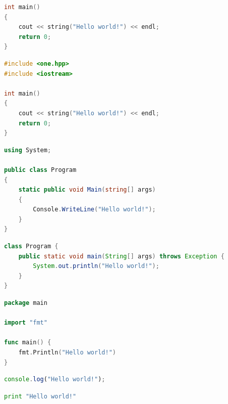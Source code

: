 \documentclass[10pt,conference,a4paper,onecolumn] {IEEEtran}
\begin{document}
\begin{multicols}{2}
\begin{lstlisting}[language=C,style=c, xleftmargin=2em, frame=single,framexleftmargin=1.5em, firstnumber=1, caption={Example C: Hello world!}, breaklines=true, label={list:compose},captionpos=b,escapechar=|]
int main()
{
    cout << string("Hello world!") << endl;
    return 0;
}
\end{lstlisting}

\begin{lstlisting}[language=C,style=c, xleftmargin=2em, frame=single,framexleftmargin=1.5em, firstnumber=1, caption={Example C++: Hello world!}, breaklines=true, label={list:compose},captionpos=b,escapechar=|]
#include <one.hpp>
#include <iostream>

int main()
{
    cout << string("Hello world!") << endl;
    return 0;
}
\end{lstlisting}

\begin{lstlisting}[language=csharp, xleftmargin=2em, frame=single,framexleftmargin=1.5em, firstnumber=1, caption={Example C\#: Hello world!}, breaklines=true, label={list:compose},captionpos=b,escapechar=|]
using System;

public class Program
{
    static public void Main(string[] args)
    {
        Console.WriteLine("Hello world!");
    }
}
\end{lstlisting}

\begin{lstlisting}[language=java, xleftmargin=2em, frame=single,framexleftmargin=1.5em, firstnumber=1, caption={Example Java: Hello world!}, breaklines=true, label={list:compose},captionpos=b,escapechar=|]
class Program {
    public static void main(String[] args) throws Exception {
        System.out.println("Hello world!");
    }
}
\end{lstlisting}

\begin{lstlisting}[language=go, xleftmargin=2em, frame=single,framexleftmargin=1.5em, firstnumber=1, caption={Example GoLang: Hello world!}, breaklines=true, label={list:compose},captionpos=b,escapechar=|]
package main

import "fmt"

func main() {
    fmt.Println("Hello world!")
}
\end{lstlisting}


\begin{lstlisting}[language=javascript, xleftmargin=2em, frame=single,framexleftmargin=1.5em, firstnumber=1, caption={Example JavaScript: Hello world!}, breaklines=true, label={list:compose},captionpos=b,escapechar=|]
console.log("Hello world!");
\end{lstlisting}


\begin{lstlisting}[language=python, xleftmargin=2em, frame=single,framexleftmargin=1.5em, firstnumber=1, caption={Example Python: Hello world!}, breaklines=true, label={list:compose},captionpos=b,escapechar=|]
print "Hello world!"
\end{lstlisting}


\end{multicols}
\end{document}
